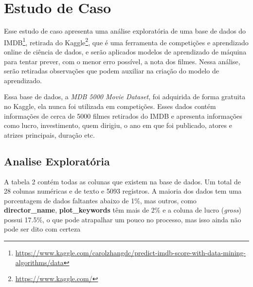 \section{Estudo de Caso}
Esse estudo de caso apresenta uma análise exploratória de uma base de dados do IMDB\footnote{\url{https://www.kaggle.com/carolzhangdc/predict-imdb-score-with-data-mining-algorithms/data}}, retirada do Kaggle\footnote{\url{https://www.kaggle.com/}}, que é uma ferramenta de competições e aprendizado online de ciência de dados, e serão aplicados modelos de aprendizado de máquina para tentar prever, com o menor erro possível, a nota dos filmes. Nessa análise, serão retiradas observações que podem auxiliar na criação do modelo de aprendizado.

Essa base de dados, a \textit{MDB 5000 Movie Dataset}, foi adquirida de forma gratuita no Kaggle, ela nunca foi utilizada em competições. Esses dados contém informações de cerca de 5000 filmes retirados do IMDB e apresenta informações como lucro, investimento, quem dirigiu, o ano em que foi publicado, atores e atrizes principais, duração etc.
\subsection{Analise Exploratória}
A tabela 2 contém todas as colunas que existem na base de dados. Um total de 28 colunas numéricas e de texto e 5093 registros. A maioria dos dados tem uma porcentagem de dados faltantes abaixo de 1\%, mas outros, como \textbf{director\_name}, \textbf{plot\_keywords} têm mais de 2\% e a coluna de lucro (\textit{gross}) possui 17.5\%, o que pode atrapalhar um pouco no processo, mas isso ainda não pode ser dito com certeza


